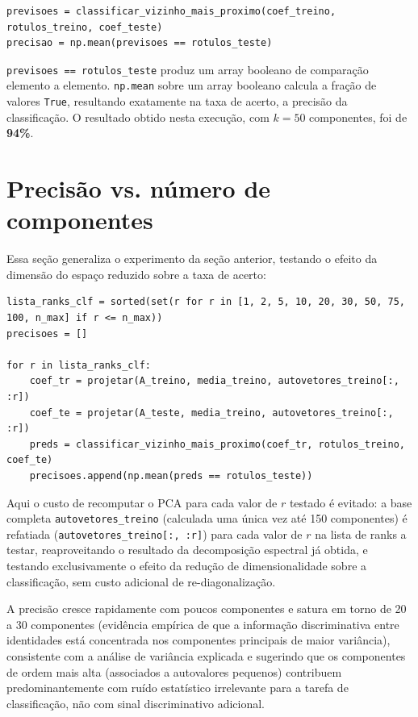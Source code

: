 \documentclass[12pt,a4paper]{article}
\begin{document}
\begin{lstlisting}
previsoes = classificar_vizinho_mais_proximo(coef_treino, rotulos_treino, coef_teste)
precisao = np.mean(previsoes == rotulos_teste)
\end{lstlisting}

\texttt{previsoes == rotulos\_teste} produz um array booleano de comparação elemento a
elemento. \texttt{np.mean} sobre um array booleano calcula a fração de valores \texttt{True}, resultando
exatamente na taxa de acerto, a precisão da classificação. O resultado obtido nesta
execução, com $k=50$ componentes, foi de \textbf{94\%}.

\section{Precisão vs. número de componentes}

Essa seção generaliza o experimento da seção anterior, testando o efeito da
dimensão do espaço reduzido sobre a taxa de acerto:

\begin{lstlisting}
lista_ranks_clf = sorted(set(r for r in [1, 2, 5, 10, 20, 30, 50, 75, 100, n_max] if r <= n_max))
precisoes = []

for r in lista_ranks_clf:
    coef_tr = projetar(A_treino, media_treino, autovetores_treino[:, :r])
    coef_te = projetar(A_teste, media_treino, autovetores_treino[:, :r])
    preds = classificar_vizinho_mais_proximo(coef_tr, rotulos_treino, coef_te)
    precisoes.append(np.mean(preds == rotulos_teste))
\end{lstlisting}

Aqui o custo de recomputar o PCA para cada valor de $r$ testado é evitado: a
base completa \texttt{autovetores\_treino} (calculada uma única vez até 150
componentes) é refatiada (\texttt{autovetores\_treino[:, :r]}) para cada valor
de $r$ na lista de ranks a testar, reaproveitando o resultado da decomposição
espectral já obtida, e testando exclusivamente o efeito da redução de
dimensionalidade sobre a classificação, sem custo adicional de re-diagonalização.

A precisão cresce rapidamente com poucos componentes e
satura em torno de 20 a 30 componentes (evidência empírica de que a informação
discriminativa entre identidades está concentrada nos componentes principais de
maior variância), consistente com a análise de variância explicada e
sugerindo que os componentes de ordem mais alta (associados a autovalores pequenos)
contribuem predominantemente com ruído estatístico irrelevante para a tarefa de
classificação, não com sinal discriminativo adicional.
\end{document}
